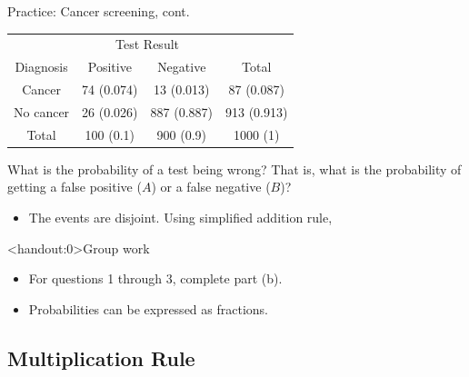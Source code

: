\documentclass[xcolor=table, aspectratio=169, bigger, handout]{beamer}
\begin{document}
\begin{frame}{Practice: Cancer screening, cont.}
\begin{block}{}
{\centering
\begin{tabular}{c | c  c | c}
\multicolumn{1}{c}{} & \multicolumn{2}{c}{Test Result}\\
Diagnosis & Positive & Negative & Total \\
\hline
Cancer & 74 (0.074) & 13 (0.013) & 87 (0.087)\\
No cancer & 26 (0.026) & 887 (0.887) & 913 (0.913)\\
\hline
Total & 100 (0.1) & 900 (0.9) & 1000 (1)
\end{tabular}\par
}
\end{block}

\begin{exampleblock}{}
What is the probability of a test being wrong? That is, what is the probability of getting a false positive ($A$) or a false negative ($B$)?

\begin{itemize}
\pause
\item The events are disjoint. Using simplified addition rule,\\
\smallskip{}
\pause{}
\end{itemize}
\end{exampleblock}
\end{frame}

\begin{frame}<handout:0>{Group work}
\begin{block}{}
\large
\begin{itemize}
\item For questions 1 through 3, complete part (b).
\item Probabilities can be expressed as fractions.
\end{itemize}
\end{block}
\end{frame}

%
%
\subsection{Multiplication Rule}
\end{document}
